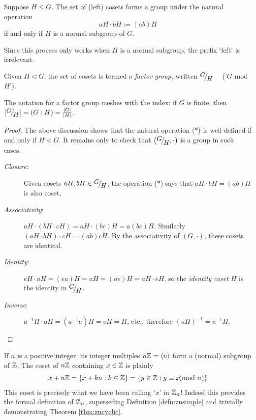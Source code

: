 \begin{thm}{}{}
	Suppose $H\le G$. The set of (left) cosets forms a group under the natural operation
	\[
		aH\cdot bH:=(ab)H \tag{$\ast$}
	\]
	if and only if $H$ is a normal subgroup of $G$.
\end{thm}

Since this process only works when $H$ is a normal subgroup, the prefix `left' is irrelevant.

\begin{defn}{}{}
	Given $H\triangleleft G$, the set of cosets is termed a \emph{factor group,} written $\quotient GH$ \ \ ('$G$ mod $H$').
\end{defn}

The notation for a factor group meshes with the index: if $G$ is finite, then $\nm{\quotient GH}=(G:H)=\frac{\nm G}{\nm H}$.


\begin{proof}
	The above discussion shows that the natural operation ($\ast$) is well-defined if and only if $H\triangleleft G$. It remains only to check that $\left(\quotient GH,\cdot\right)$ is a group in such cases.
	\begin{description}
		\item[\normalfont\emph{Closure}:] Given cosets $aH,bH\in\quotient GH$,  the operation ($\ast$) says that $aH\cdot bH=(ab)H$ is also coset.
		\item[\normalfont\emph{Associativity}:] $aH\cdot(bH\cdot cH)=aH\cdot(bc)H=a(bc)H$. Similarly $(aH\cdot bH)\cdot cH=(ab)cH$. By the associativity of $(G,\cdot)$, these cosets are identical.
		\item[\normalfont\emph{Identity}:] $eH\cdot aH=(ea)H=aH=(ae)H=aH\cdot eH$, so the \emph{identity coset} $H$ is the identity in $\quotient GH$.
		\item[\normalfont\emph{Inverse}:] $a^{-1}H\cdot aH=(a^{-1}a)H=eH=H$, etc., therefore $(aH)^{-1}=a^{-1}H$.\qedhere
	\end{description}
\end{proof}

\fi
\goodbreak



If $n$ is a positive integer, its integer multiples $n\mathbb{Z}=\left\langle n\right\rangle$ form a (normal) subgroup of $\mathbb{Z}$. The coset of $n\mathbb{Z}$ containing $x\in\mathbb{Z}$ is plainly
\[
	x+n\mathbb{Z}=\{x+kn:k\in\mathbb{Z}\}
	=\{y\in\mathbb{Z}:y\equiv x\negthickspace\negthickspace\pmod n\}
\]
This coset is precisely what we have been calling `$x$' in $\mathbb{Z}_n$! Indeed this provides the formal definition of $\mathbb{Z}_n$, superseding Definition \ref{defn:znsimple} and trivially demonstrating Theorem \ref{thm:zncyclic}.

